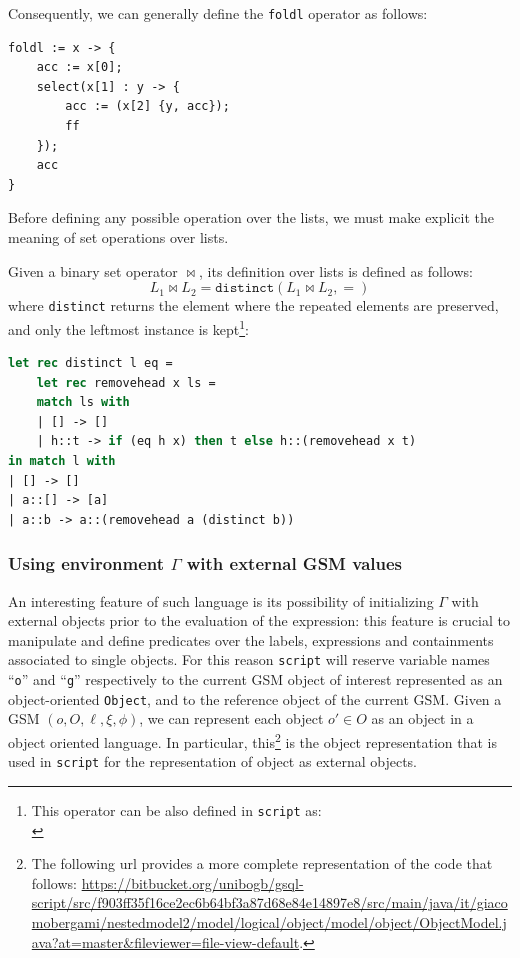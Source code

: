 Consequently, we can generally define the \texttt{foldl} operator as follows:
\begin{lstlisting}[language=Script]
foldl := x -> {
	acc := x[0];
	select(x[1] : y -> {
		acc := (x[2] {y, acc});
		ff
	});
	acc
}
\end{lstlisting}

Before defining any possible operation over the lists, we must make explicit the meaning of  set operations over lists.

\begin{definition}
	Given a binary set operator $\bowtie$, its definition over lists is defined as follows:
	\[L_1\bowtie L_2 = \texttt{distinct}(L_1\bowtie L_2,=)\]
	where \texttt{distinct} returns the element where the repeated elements are preserved, and only the leftmost instance is kept\footnote{This operator can be also defined in \texttt{script} as:\\ }:
\begin{lstlisting}[language=Caml]
let rec distinct l eq =
	let rec removehead x ls =
	match ls with
	| [] -> []
	| h::t -> if (eq h x) then t else h::(removehead x t)
in match l with
| [] -> []
| a::[] -> [a]
| a::b -> a::(removehead a (distinct b))
\end{lstlisting}
\end{definition}

\subsubsection{Using environment $\Gamma$ with external GSM values}\label{label:ucwegsmv}
An interesting feature of such language is its possibility of initializing $\Gamma$ with external objects prior to the evaluation of the expression: this feature is crucial to manipulate and define predicates over the labels, expressions and containments associated to single objects. For this reason \texttt{script} will reserve variable names ``\texttt{o}'' and ``\texttt{g}'' respectively to the current GSM object of interest represented as an object-oriented \texttt{Object}, and to the reference object of the current GSM.
\label{app:JavaObject}
Given a GSM $(o,O,\ell,\xi,\phi)$, we can represent each object $o'\in O$ as an object in a object oriented language. In particular, this\footnote{The following url provides a more complete representation of the code that follows: \url{https://bitbucket.org/unibogb/gsql-script/src/f903ff35f16ce2ec6b64bf3a87d68e84e14897e8/src/main/java/it/giacomobergami/nestedmodel2/model/logical/object/model/object/ObjectModel.java?at=master&fileviewer=file-view-default}.} is the object representation that is used in \texttt{script} for the representation of object as external objects.

